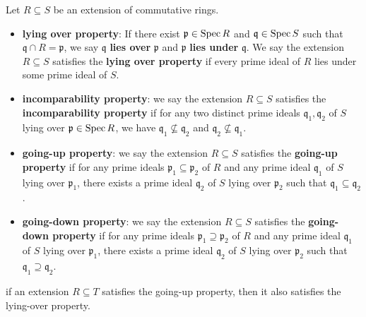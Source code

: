 \begin{definition}{}{}
    Let $R\subseteq S$ be an extension of commutative rings.
    \begin{itemize}
        \item \textbf{lying over property}: If there exist $\mathfrak{p}\in \operatorname{Spec} R$ and $\mathfrak{q}\in \operatorname{Spec} S$ such that $\mathfrak{q}\cap R=\mathfrak{p}$, we say $\mathfrak{q}$ \textbf{lies over} $\mathfrak{p}$ and $\mathfrak{p}$ \textbf{lies under} $\mathfrak{q}$. We say the extension $R\subseteq S$ satisfies the \textbf{lying over property} if every prime ideal of $R$ lies under some prime ideal of $S$.
        \item \textbf{incomparability property}: we say the extension $R\subseteq S$ satisfies the \textbf{incomparability property} if for any two distinct prime ideals $\mathfrak{q}_1, \mathfrak{q}_2$ of $S$ lying over  $\mathfrak{p}\in \operatorname{Spec} R$, we have $\mathfrak{q}_1\not\subseteq \mathfrak{q}_2$ and $\mathfrak{q}_2\not\subseteq \mathfrak{q}_1$.
        \item \textbf{going-up property}: we say the extension $R\subseteq S$ satisfies the \textbf{going-up property} if for any prime ideals $\mathfrak{p}_1\subseteq \mathfrak{p}_2$ of $R$ and any prime ideal $\mathfrak{q}_1$ of $S$ lying over $\mathfrak{p}_1$, there exists a prime ideal $\mathfrak{q}_2$ of $S$ lying over $\mathfrak{p}_2$ such that $\mathfrak{q}_1\subseteq \mathfrak{q}_2$.
        \item \textbf{going-down property}: we say the extension $R\subseteq S$ satisfies the \textbf{going-down property} if for any prime ideals $\mathfrak{p}_1\supseteq \mathfrak{p}_2$ of $R$ and any prime ideal $\mathfrak{q}_1$ of $S$ lying over $\mathfrak{p}_1$, there exists a prime ideal $\mathfrak{q}_2$ of $S$ lying over $\mathfrak{p}_2$ such that $\mathfrak{q}_1\supseteq \mathfrak{q}_2$.
    \end{itemize}
\end{definition}

\begin{proposition}{}{}
    if an extension $R \subseteq  T$ satisfies the going-up property, then it also satisfies the lying-over property.
\end{proposition}


